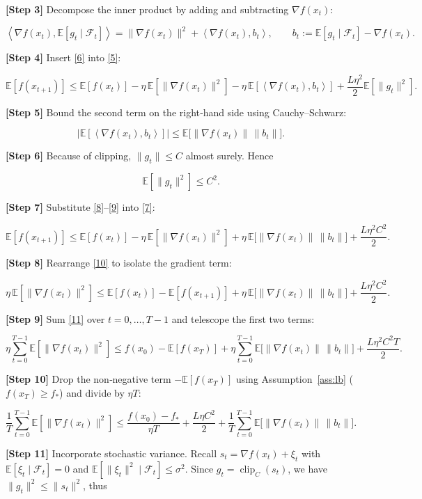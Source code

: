 \documentclass{article}
\newcommand{\E}{\mathbb{E}}
\newcommand{\ip}[2]{\left\langle #1,#2\right\rangle}
\begin{document}
\noindent\textbf{[Step 3]} Decompose the inner product by adding and
subtracting $\nabla f(x_{t})$:

\[
\ip{\nabla f(x_{t})}{\E[g_{t}\mid\mathcal{F}_{t}]}
=\|\nabla f(x_{t})\|^{2}+\ip{\nabla f(x_{t})}{b_{t}},
\qquad b_{t}:=\E[g_{t}\mid\mathcal{F}_{t}]-\nabla f(x_{t}). \tag{6}
\]

\noindent\textbf{[Step 4]} Insert \eqref{6} into \eqref{5}:

\[
\E[f(x_{t+1})]\le \E[f(x_{t})]
-\eta\,\E[\|\nabla f(x_{t})\|^{2}]
-\eta\,\E[\ip{\nabla f(x_{t})}{b_{t}}]
+\frac{L\eta^{2}}{2}\E[\|g_{t}\|^{2}]. \tag{7}
\]

\noindent\textbf{[Step 5]} Bound the second term on the right‑hand side
using Cauchy–Schwarz:

\[
\bigl|\E[\ip{\nabla f(x_{t})}{b_{t}}]\bigr|
\le \E\!\bigl[\|\nabla f(x_{t})\|\,\|b_{t}\|\bigr]. \tag{8}
\]

\noindent\textbf{[Step 6]} Because of clipping, $\|g_{t}\|\le C$ almost surely.
Hence  

\[
\E[\|g_{t}\|^{2}]\le C^{2}. \tag{9}
\]

\noindent\textbf{[Step 7]} Substitute \eqref{8}–\eqref{9} into \eqref{7}:

\[
\E[f(x_{t+1})]\le \E[f(x_{t})]
-\eta\,\E[\|\nabla f(x_{t})\|^{2}]
+\eta\,\E\!\bigl[\|\nabla f(x_{t})\|\,\|b_{t}\|\bigr]
+\frac{L\eta^{2}C^{2}}{2}. \tag{10}
\]

\noindent\textbf{[Step 8]} Rearrange \eqref{10} to isolate the gradient term:

\[
\eta\,\E[\|\nabla f(x_{t})\|^{2}]
\le \E[f(x_{t})]-\E[f(x_{t+1})]
+\eta\,\E\!\bigl[\|\nabla f(x_{t})\|\,\|b_{t}\|\bigr]
+\frac{L\eta^{2}C^{2}}{2}. \tag{11}
\]

\noindent\textbf{[Step 9]} Sum \eqref{11} over $t=0,\dots,T-1$ and telescope
the first two terms:

\[
\eta\sum_{t=0}^{T-1}\E[\|\nabla f(x_{t})\|^{2}]
\le f(x_{0})- \E[f(x_{T})]
+\eta\sum_{t=0}^{T-1}\E\!\bigl[\|\nabla f(x_{t})\|\,\|b_{t}\|\bigr]
+\frac{L\eta^{2}C^{2}T}{2}. \tag{12}
\]

\noindent\textbf{[Step 10]} Drop the non‑negative term $-\E[f(x_{T})]$
using Assumption~\ref{ass:lb} ($f(x_{T})\ge f_{*}$) and divide by $\eta T$:

\[
\frac{1}{T}\sum_{t=0}^{T-1}\E[\|\nabla f(x_{t})\|^{2}]
\le \frac{f(x_{0})-f_{*}}{\eta T}
+\frac{L\eta C^{2}}{2}
+\frac{1}{T}\sum_{t=0}^{T-1}\E\!\bigl[\|\nabla f(x_{t})\|\,\|b_{t}\|\bigr]. \tag{13}
\]

\noindent\textbf{[Step 11]} Incorporate stochastic variance.
Recall $s_{t}= \nabla f(x_{t}) + \xi_{t}$ with $\E[\xi_{t}\mid\mathcal{F}_{t}]=0$
and $\E[\|\xi_{t}\|^{2}\mid\mathcal{F}_{t}]\le\sigma^{2}$.
Since $g_{t}=\operatorname{clip}_{C}(s_{t})$, we have
$\|g_{t}\|^{2}\le\|s_{t}\|^{2}$, thus  
\end{document}
